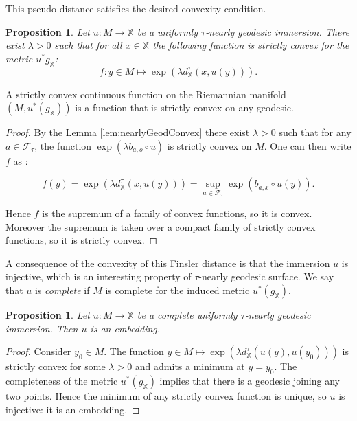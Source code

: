 \documentclass[reqno,10pt]{amsart}
\theoremstyle{plain}
\newtheorem{prop}[thm]{Proposition}
\theoremstyle{definition}
\theoremstyle{remark}
\newcommand{\type}{\tau}
\newcommand{\X}{\mathbb{X}}
\begin{document}
This pseudo distance satisfies the desired convexity condition.
\begin{prop}
\label{prop:convexNorm}
Let $u:M\to \X$ be a uniformly $\type$-nearly geodesic immersion. There exist $\lambda>0$ such that for all $x\in \X$  the following function is strictly convex for the metric $u^*g_\X$:
$$f:y\in M\mapsto \exp\left(\lambda d^\type_\X(x,u(y))\right).$$

\end{prop}

A strictly convex continuous function on the Riemannian manifold $\left(M, u^*(g_\X)\right)$ is a function that is strictly convex on any geodesic.


\medskip

\begin{proof}
By the Lemma \ref{lem:nearlyGeodConvex} there exist $\lambda>0$ such that for any $a\in \mathcal{F}_\type$, the function $\exp\left(\lambda b_{a,o}\circ u\right)$ is strictly convex on $M$. One can then write $f$ as :

$$ f(y)=\exp\left(\lambda d^\type_\X(x,u(y))\right)=\sup_{a\in\mathcal{F}_\type} \exp\left(b_{a,x}\circ u (y)\right).$$

Hence $f$ is the supremum of a family of convex functions, so it is convex. Moreover the supremum is taken over a compact family of strictly convex functions, so it is strictly convex.

\end{proof}

A consequence of the convexity of this Finsler distance is that the immersion $u$ is injective, which is an interesting property of $\type$-nearly geodesic surface. We say that $u$ is \emph{complete} if $M$ is complete for the induced metric $u^*(g_\X)$.

\begin{prop}
\label{prop:nearlyGeodEmbedding}
Let $u:M\to \X$ be a complete uniformly $\type$-nearly geodesic immersion. Then $u$ is an embedding.
\end{prop}

\begin{proof}
Consider $y_0\in M$. The function $y\in M\mapsto \exp\left(\lambda d^\type_\X(u(y),u(y_0))\right)$ is strictly convex for some $\lambda>0$ and admits a minimum at $y=y_0$. The completeness of the metric $u^*(g_\X)$ implies that there is a geodesic joining any two points. Hence the minimum of any strictly convex function is unique, so $u$ is injective: it is an embedding.
\end{proof}
\end{document}
